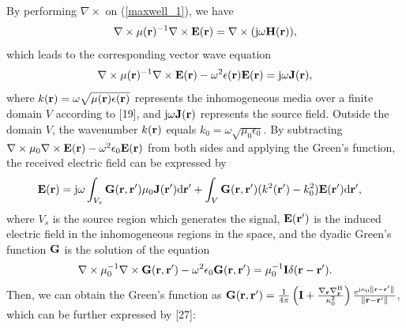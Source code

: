 \documentclass[a4paper,12pt]{article}
\begin{document}
\begin{framed}
{\color{red}
	\quad By performing $\nabla\times$ on (\ref{maxwell_1}), we have
	\begin{equation}
		\nabla \times \mu({\bf r})^{-1} \nabla \times {\bf E}({\bf r}) = \nabla \times ({\rm j}\omega{\bf H}({\bf r})),
	\end{equation}
	 which leads to the corresponding vector wave equation
	 \begin{equation}
	 	\nabla \times \mu({\bf r})^{-1} \nabla \times {\bf E}({\bf r}) - \omega^2 \epsilon({\bf r})  {\bf E}({\bf r}) = {\rm j}\omega {\bf J}({\bf r}),
	 \end{equation}
	 where $k({\bf r}) = \omega \sqrt{\mu({\bf r})\epsilon({\bf r})}$ represents the inhomogeneous media over a finite domain $V$ according to [19], and ${\rm j}\omega {\bf J}({\bf r})$ represents the source field. Outside the domain $V$, the wavenumber $k({\bf r})$ equals $k_0 = \omega\sqrt{\mu_0\epsilon_0}$.
	 By subtracting $\nabla \times \mu_0 \nabla  \times {\bf E}({\bf r})- \omega^2 \epsilon_0 {\bf E}({\bf r})$ from both sides and applying the Green's function, the received electric field can be expressed by
\begin{equation}
	\begin{aligned} 
		{\bf E}({\bf r}) &= {\rm j}\omega\int_{V_s} {\bf G}({\bf r},{\bf r}')\mu_0{\bf J}({\bf r}'){\rm d}{\bf r}' 
		+ \int_{V} {\bf G}({\bf r},{\bf r}')(k^2({\bf r}')-k_0^2) 
		{\bf E}({\bf r}'){\rm d}{\bf r}',
	\end{aligned}
	\label{equ_scattering_field}
\end{equation}
where $V_s$ is the source region which generates the signal, ${\bf E}({\bf r}')$ is the induced electric field in the inhomogeneous regions in the space, and the dyadic Green's function ${\bf G}$ is the solution of the equation
\begin{equation}
	\begin{aligned} 
		\nabla \times \mu_0^{-1} \nabla \times {\bf G}({\bf r},{\bf r}') - \omega^2 \epsilon_0  {\bf G}({\bf r},{\bf r}') = \mu_0^{-1} {\bf I} \delta({\bf r}-{\bf r}').
	\end{aligned}
\end{equation}
Then, we can obtain the Green's function as ${\bf G}({\bf r},{\bf r}') = \frac{1}{{4\pi }} \left( {{\bf{I}} + \frac{{{\nabla _{\bf{r}}}\nabla _{\bf{r}}^{\rm{H}}}}{{{\kappa_0 ^2}}}} \right) \frac{{{e^{{\rm{j}}\kappa_0 \left\| {{\bf{r}} - {\bf{r}'}} \right\|}}}}{{\left\| {{\bf{r}} - {\bf{r}'}} \right\|}} $, which can be further expressed by [27]:
\begin{equation}

\end{equation}}
\end{framed}
\end{document}
